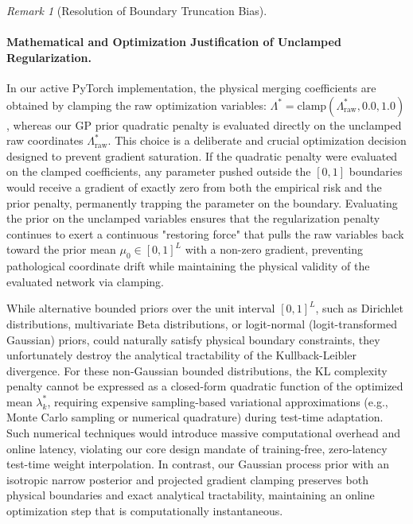 \documentclass{article}
\theoremstyle{plain}
\theoremstyle{definition}
\theoremstyle{remark}
\newtheorem{remark}{Remark}
\begin{document}
\begin{remark}[Resolution of Boundary Truncation Bias]
\paragraph{Mathematical and Optimization Justification of Unclamped Regularization.}
In our active PyTorch implementation, the physical merging coefficients are obtained by clamping the raw optimization variables: $\Lambda^* = \text{clamp}(\Lambda^*_{\text{raw}}, 0.0, 1.0)$, whereas our GP prior quadratic penalty is evaluated directly on the unclamped raw coordinates $\Lambda^*_{\text{raw}}$. This choice is a deliberate and crucial optimization decision designed to prevent gradient saturation. If the quadratic penalty were evaluated on the clamped coefficients, any parameter pushed outside the $[0, 1]$ boundaries would receive a gradient of exactly zero from both the empirical risk and the prior penalty, permanently trapping the parameter on the boundary. Evaluating the prior on the unclamped variables ensures that the regularization penalty continues to exert a continuous "restoring force" that pulls the raw variables back toward the prior mean $\mu_0 \in [0, 1]^L$ with a non-zero gradient, preventing pathological coordinate drift while maintaining the physical validity of the evaluated network via clamping.

While alternative bounded priors over the unit interval $[0, 1]^L$, such as Dirichlet distributions, multivariate Beta distributions, or logit-normal (logit-transformed Gaussian) priors, could naturally satisfy physical boundary constraints, they unfortunately destroy the analytical tractability of the Kullback-Leibler divergence. For these non-Gaussian bounded distributions, the KL complexity penalty cannot be expressed as a closed-form quadratic function of the optimized mean $\lambda_k^*$, requiring expensive sampling-based variational approximations (e.g., Monte Carlo sampling or numerical quadrature) during test-time adaptation. Such numerical techniques would introduce massive computational overhead and online latency, violating our core design mandate of training-free, zero-latency test-time weight interpolation. In contrast, our Gaussian process prior with an isotropic narrow posterior and projected gradient clamping preserves both physical boundaries and exact analytical tractability, maintaining an online optimization step that is computationally instantaneous.
\end{remark}
\end{document}
